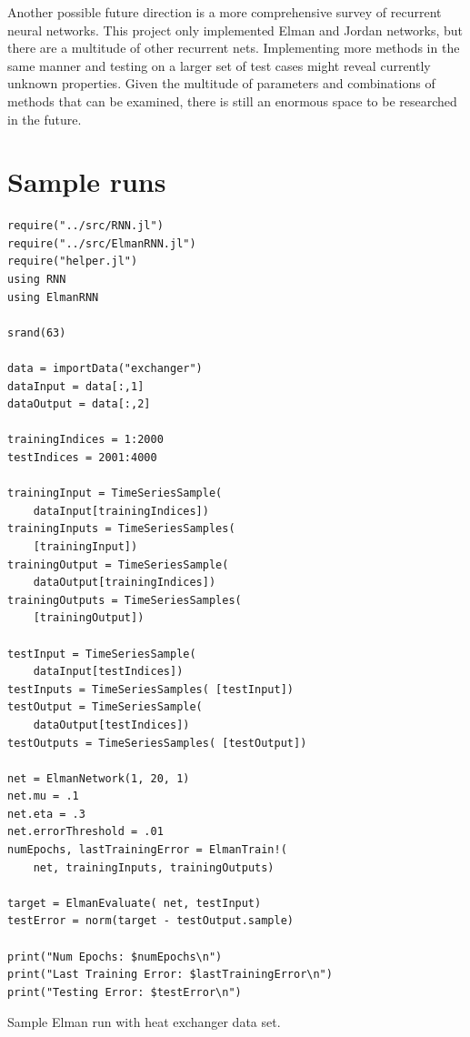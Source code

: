 \documentclass{acm_proc_article-sp}
\begin{document}
Another possible future direction is a more comprehensive survey of recurrent neural networks.
This project only implemented Elman and Jordan networks, but there are a multitude of other recurrent nets.
Implementing more methods in the same manner and testing on a larger set of test cases might reveal currently unknown properties.
Given the multitude of parameters and combinations of methods that can be examined, there is still an enormous space to be researched in the future.






\appendix

\section{Sample runs}

\begin{listing}
\begin{snugshade}
\begin{verbatim}
require("../src/RNN.jl")
require("../src/ElmanRNN.jl")
require("helper.jl")
using RNN
using ElmanRNN

srand(63)

data = importData("exchanger")
dataInput = data[:,1]
dataOutput = data[:,2]

trainingIndices = 1:2000
testIndices = 2001:4000

trainingInput = TimeSeriesSample( 
    dataInput[trainingIndices])
trainingInputs = TimeSeriesSamples( 
    [trainingInput])
trainingOutput = TimeSeriesSample( 
    dataOutput[trainingIndices])
trainingOutputs = TimeSeriesSamples( 
    [trainingOutput])

testInput = TimeSeriesSample( 
    dataInput[testIndices])
testInputs = TimeSeriesSamples( [testInput])
testOutput = TimeSeriesSample( 
    dataOutput[testIndices])
testOutputs = TimeSeriesSamples( [testOutput])

net = ElmanNetwork(1, 20, 1)
net.mu = .1
net.eta = .3
net.errorThreshold = .01
numEpochs, lastTrainingError = ElmanTrain!(
    net, trainingInputs, trainingOutputs)

target = ElmanEvaluate( net, testInput)
testError = norm(target - testOutput.sample)

print("Num Epochs: $numEpochs\n")
print("Last Training Error: $lastTrainingError\n")
print("Testing Error: $testError\n")
\end{verbatim}
\end{snugshade}
\caption{Sample Elman run with heat exchanger data set.}
\label{code:exchangerElman}
\end{listing}
\end{document}
